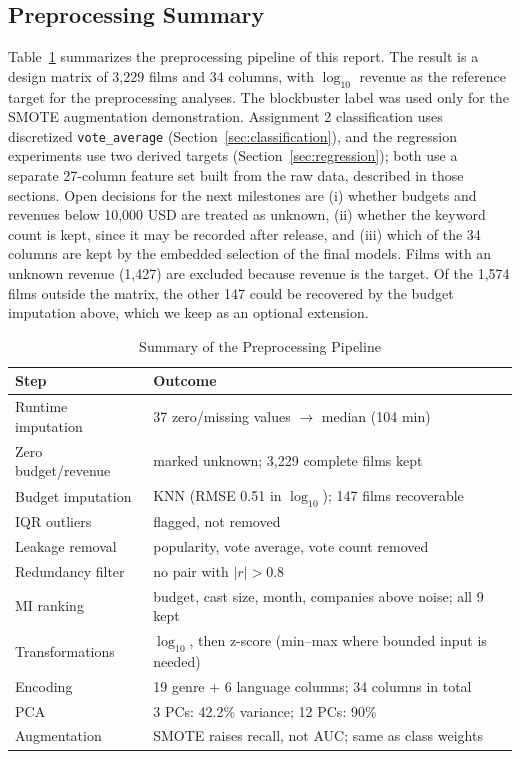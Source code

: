 \documentclass[conference]{IEEEtran}
\begin{document}
\subsection{Preprocessing Summary}
Table~\ref{tab:p4_summary} summarizes the preprocessing pipeline of this report. The result is a design
matrix of 3,229 films and 34 columns, with $\log_{10}$ revenue as the reference target for the preprocessing analyses. The blockbuster label was used only for the SMOTE augmentation demonstration. Assignment 2 classification uses discretized \texttt{vote\_average} (Section~\ref{sec:classification}), and the regression experiments use two derived targets (Section~\ref{sec:regression}); both use a separate 27-column feature set built from the raw data, described in those sections. Open decisions for the next milestones are (i) whether budgets and revenues below 10,000 USD are treated as unknown,
(ii) whether the keyword count is kept, since it may be recorded after release, and
(iii) which of the 34 columns are kept by the embedded selection of the final models. Films with an unknown revenue (1,427) are excluded because revenue is the target. Of the 1,574 films outside the matrix, the other 147 could be recovered by the budget imputation
above, which we keep as an optional extension.

\begin{table}[t]
\caption{Summary of the Preprocessing Pipeline}
\label{tab:p4_summary}
\centering
\scriptsize
\setlength{\tabcolsep}{3pt}
\begin{tabular}{p{}p{}}
\toprule
Step & Outcome \\
\midrule
Runtime imputation & 37 zero/missing values $\rightarrow$ median (104 min) \\
Zero budget/revenue & marked unknown; 3,229 complete films kept \\
Budget imputation & KNN (RMSE 0.51 in $\log_{10}$); 147 films recoverable \\
IQR outliers & flagged, not removed \\
Leakage removal & popularity, vote average, vote count removed \\
Redundancy filter & no pair with $|r|>0.8$ \\
MI ranking & budget, cast size, month, companies above noise; all 9 kept \\
Transformations & $\log_{10}$, then z-score (min--max where bounded input is needed) \\
Encoding & 19 genre + 6 language columns; 34 columns in total \\
PCA & 3 PCs: 42.2\% variance; 12 PCs: 90\% \\
Augmentation & SMOTE raises recall, not AUC; same as class weights \\
\bottomrule
\end{tabular}
\end{table}
\end{document}
